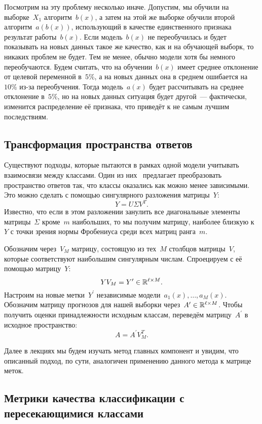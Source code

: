 \documentclass[12pt,fleqn]{article}
\begin{document}
Посмотрим на эту проблему несколько иначе.
Допустим, мы обучили на выборке~$X_1$ алгоритм~$b(x)$,
а затем на этой же выборке обучили второй алгоритм~$a(b(x))$,
использующий в качестве единственного признака результат работы~$b(x)$.
Если модель~$b(x)$ не переобучилась и будет показывать на новых данных такое же
качество, как и на обучающей выборк, то никаких проблем не будет.
Тем не менее, обычно модели хотя бы немного переобучаются.
Будем считать, что на обучении~$b(x)$ имеет среднее отклонение от целевой переменной в~$5\%$,
а на новых данных она в среднем ошибается на~$10\%$ из-за переобучения.
Тогда модель~$a(x)$ будет рассчитывать на среднее отклонение в~$5\%$, но на новых
данных ситуация будет другой~--- фактически, изменится распределение её признака,
что приведёт к не самым лучшим последствиям.

\subsection{Трансформация пространства ответов}

Существуют подходы, которые пытаются в рамках одной модели учитывать взаимосвязи между классами.
Один из них~\cite{tai12multilabel} предлагает преобразовать пространство
ответов так, что классы оказались как можно менее зависимыми.
Это можно сделать с помощью сингулярного разложения матрицы~$Y$:
\[
    Y = U \Sigma V^T.
\]
Известно, что если в этом разложении занулить все диагональные элементы
матрицы~$\Sigma$ кроме~$m$ наибольших, то мы получим матрицу,
наиболее близкую к~$Y$ с точки зрения нормы Фробениуса среди
всех матриц ранга~$m$.

Обозначим через~$V_M$ матрицу, состоящую из тех~$M$ столбцов матрицы~$V$,
которые соответствуют наибольшим сингулярным числам.
Спроецируем с её помощью матрицу~$Y$:
\[
    Y V_M
    =
    Y^\prime
    \in
    \RR^{\ell \times M}.
\]
Настроим на новые метки~$Y^\prime$ независимые модели~$a_1(x), \dots, a_M(x)$.
Обозначим матрицу прогнозов для нашей выборки через~$A^\prime \in \RR^{\ell \times M}$.
Чтобы получить оценки принадлежности исходным классам, переведём матрицу~$A^\prime$ в исходное пространство:
\[
    A = A^\prime V_M^T.
\]

Далее в лекциях мы будем изучать метод главных компонент и увидим,
что описанный подход, по сути, аналогичен применению данного метода
к матрице меток.

\subsection{Метрики качества классификации с пересекающимися классами}
\end{document}
